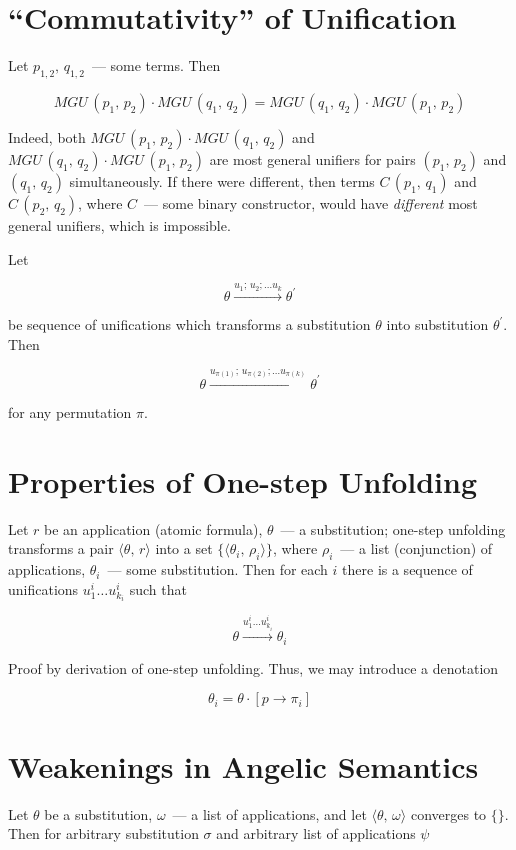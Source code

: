 \documentclass{article}[12pt]
\newcommand{\inbr}[1]{\langle #1 \rangle}
\begin{document}
\section{``Commutativity'' of Unification}

Let $p_{1,2},\,q_{1,2}$~--- some terms. Then

\[
MGU\,(p_1,\,p_2)\cdot MGU\,(q_1,\,q_2)=MGU\,(q_1,\,q_2)\cdot MGU\,(p_1,\,p_2)
\]

Indeed, both $MGU\,(p_1,\,p_2)\cdot MGU\,(q_1,\,q_2)$ and $MGU\,(q_1,\,q_2)\cdot MGU\,(p_1,\,p_2)$ are most general unifiers
for pairs $(p_1,\,p_2)$ and $(q_1,\,q_2)$ simultaneously. If there were different, then terms $C\,(p_1,\,q_1)$ and
$C\,(p_2,\,q_2)$, where $C$~--- some binary constructor, would have \emph{different} most general unifiers, which is impossible.

Let

\[
\theta\xrightarrow{u_1;\,u_2;\dots u_k}{\theta^\prime}
\]

be sequence of unifications which transforms a substitution $\theta$ into substitution $\theta^\prime$. Then

\[
\theta\xrightarrow{u_{\pi(1)};\,u_{\pi(2)};\dots u_{\pi(k)}}{\theta^\prime}
\]

for any permutation $\pi$.

\section{Properties of One-step Unfolding}

Let $r$ be an application (atomic formula), $\theta$~--- a substitution; one-step unfolding transforms a pair $\inbr{\theta,\,r}$ into
a set $\{\inbr{\theta_i,\,\rho_i}\}$, where $\rho_i$~--- a list (conjunction) of applications, $\theta_i$~--- some substitution. Then
for each $i$ there is a sequence of unifications $u^i_1\dots u^i_{k_i}$ such that

\[
\theta\xrightarrow{u^i_1\dots u^i_{k_i}}{\theta_i}
\]

Proof by derivation of one-step unfolding. Thus, we may introduce a denotation

\[
\theta_i=\theta\cdot[p\to\pi_i]
\]

\section{Weakenings in Angelic Semantics}

Let $\theta$ be a substitution, $\omega$~--- a list of applications, and let $\inbr{\theta,\,\omega}$ converges to $\{\}$. Then for arbitrary substitution $\sigma$ and
arbitrary list of applications $\psi$
\end{document}
